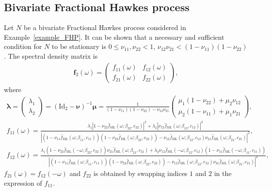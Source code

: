 \documentclass[11pt]{article}
\numberwithin{equation}{section}
\theoremstyle{plain}
\theoremstyle{definition}
\theoremstyle{definition}
\theoremstyle{assumption}
\theoremstyle{proposition}
\theoremstyle{proposition}
\theoremstyle{example}
\theoremstyle{lemma}
\theoremstyle{theorem}
\theoremstyle{remark}
\begin{document}
\subsection{Bivariate Fractional Hawkes process}
\label{example_bivariate_FHP}
Let $N$ be a bivariate Fractional Hawkes process considered in Example~\ref{example_FHP}. It can be shown that a necessary and sufficient condition for $N$ to be stationary is $0\leqslant\nu_{11},\nu_{22}<1$, $\nu_{12}\nu_{21}<(1 - \nu_{11})(1 - \nu_{22})$. The spectral density matrix is
\begin{align*}
\boldsymbol{f}_2(\omega) = 
\begin{pmatrix}
f_{11}(\omega) & f_{12}(\omega) \\
f_{21}(\omega) & f_{22}(\omega)
\end{pmatrix} ,
\end{align*}
where
\begin{align*}
\boldsymbol{\lambda} = 
\begin{pmatrix}
\lambda_1 \\
\lambda_2
\end{pmatrix}
=(\boldsymbol{\mathrm{Id}}_2 - \boldsymbol{\nu})^{-1}\boldsymbol{\mu}
=\frac{1}{(1 - \nu_{11})(1 - \nu_{22}) -\nu_{12}\nu_{21}}\begin{pmatrix}
\mu_1(1 - \nu_{22}) + \mu_2\nu_{12} \\
\mu_2(1 - \nu_{11}) + \mu_1\nu_{21}
\end{pmatrix} ,
\end{align*}
\begin{align*}
f_{11}(\omega) =  \frac{\lambda_1|1 - \nu_{22}\hat{f}_{\mathrm{ML}}(\omega;\beta_{22},c_{22})|^2 + \lambda_2|\nu_{12}\hat{f}_{\mathrm{ML}}(\omega;\beta_{12},c_{12})|^2}{|(1 - \nu_{11}\hat{f}_{\mathrm{ML}}(\omega;\beta_{11},c_{11}))(1 - \nu_{22}\hat{f}_{\mathrm{ML}}(\omega;\beta_{22},c_{22})) -\nu_{12}\hat{f}_{\mathrm{ML}}(\omega;\beta_{12},c_{12})\nu_{21}\hat{f}_{\mathrm{ML}}(\omega;\beta_{21},c_{21})|^2}   ,
\end{align*}
\begin{align*}
f_{12}(\omega) =  \frac{\lambda_1(1 - \nu_{22}\hat{f}_{\mathrm{ML}}(-\omega;\beta_{22},c_{22}))\nu_{21}\hat{f}_{\mathrm{ML}}(\omega;\beta_{21},c_{21}) + \lambda_2\nu_{12}\hat{f}_{\mathrm{ML}}(-\omega;\beta_{12},c_{12})(1 - \nu_{11}\hat{f}_{\mathrm{ML}}(-\omega;\beta_{11},c_{11}))}{|(1 - \nu_{11}\hat{f}_{\mathrm{ML}}(\omega;\beta_{11},c_{11}))(1 - \nu_{22}\hat{f}_{\mathrm{ML}}(\omega;\beta_{22},c_{22})) -\nu_{12}\hat{f}_{\mathrm{ML}}(\omega;\beta_{12},c_{12})\nu_{21}\hat{f}_{\mathrm{ML}}(\omega;\beta_{21},c_{21})|^2}  ,
\end{align*}
$f_{21}(\omega) = f_{12}(-\omega)$ and $f_{22}$ is obtained by swapping indices $1$ and $2$ in the expression of $f_{11}$. 
\end{document}
